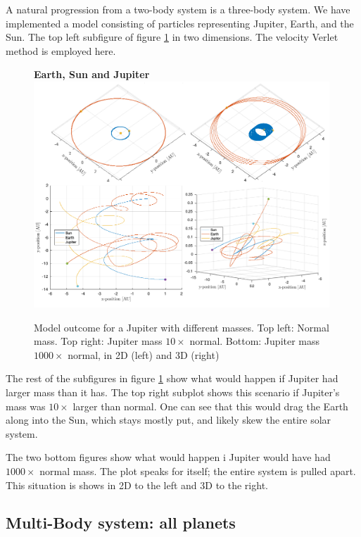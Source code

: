 \documentclass[10pt,a4paper]{amsart}
\begin{document}
A natural progression from a two-body system is a three-body system. We have implemented a model consisting of particles representing Jupiter, Earth, and the Sun. The top left subfigure of figure \ref{fig:jupiter} in two dimensions. The velocity Verlet method is employed here.

\begin{figure}
	\centering
	\textbf{Earth, Sun and Jupiter}
	\includegraphics[width=0.99\textwidth]{../figures/threebody.png}
	\caption{Model outcome for a Jupiter with different masses. Top left: Normal mass. Top right: Jupiter mass $10\times$ normal. Bottom: Jupiter mass $1000\times$ normal, in 2D (left) and 3D (right)\label{fig:jupiter}}
\end{figure}

The rest of the subfigures in figure \ref{fig:jupiter} show what would happen if Jupiter had larger mass than it has. The top right subplot shows this scenario if Jupiter's mass was $10\times$ larger than normal. One can see that this would drag the Earth along into the Sun, which stays mostly put, and likely skew the entire solar system.

The two bottom figures show what would happen i Jupiter would have had $1000\times$ normal mass. The plot speaks for itself; the entire system is pulled apart. This situation is shows in 2D to the left and 3D to the right.

\subsection{Multi-Body system: all planets}
\end{document}

